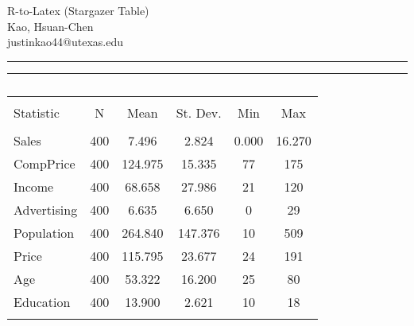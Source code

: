 \documentclass[12pt]{article}
\makeatletter
\newcommand{\soptitle}{R-to-Latex (Stargazer Table)\\}
\newcommand{\yourname}{Kao, Hsuan-Chen}
\newcommand{\youremail}{justinkao44@utexas.edu}
\makeatother
\begin{document}
\begin{center}
	\Large\soptitle
	\large  \yourname \\ \normalsize \youremail
\end{center}
	\hrule
	\vspace{1pt}
	\hrule height 1pt
	
	\bigskip

\begin{table}[!htbp] \centering 
  \caption{} 
  \label{} 
\begin{tabular}{@{\extracolsep{5pt}}lccccc} 
\\[-1.8ex]\hline 
\hline \\[-1.8ex] 
Statistic & \multicolumn{1}{c}{N} & \multicolumn{1}{c}{Mean} & \multicolumn{1}{c}{St. Dev.} & \multicolumn{1}{c}{Min} & \multicolumn{1}{c}{Max} \\ 
\hline \\[-1.8ex] 
Sales & 400 & 7.496 & 2.824 & 0.000 & 16.270 \\ 
CompPrice & 400 & 124.975 & 15.335 & 77 & 175 \\ 
Income & 400 & 68.658 & 27.986 & 21 & 120 \\ 
Advertising & 400 & 6.635 & 6.650 & 0 & 29 \\ 
Population & 400 & 264.840 & 147.376 & 10 & 509 \\ 
Price & 400 & 115.795 & 23.677 & 24 & 191 \\ 
Age & 400 & 53.322 & 16.200 & 25 & 80 \\ 
Education & 400 & 13.900 & 2.621 & 10 & 18 \\ 
\hline \\[-1.8ex] 
\end{tabular} 
\end{table} 
\end{document}
